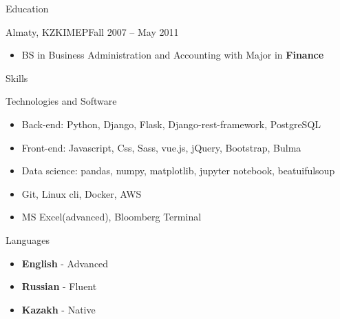 \documentclass[]{mcdowellcv}
\begin{document}
\pagebreak

\begin{cvsection}{Education}
  \begin{cvsubsection}{Almaty, KZ}{KIMEP}{Fall 2007 -- May 2011}
    \begin{itemize}
      \item BS in Business Administration and Accounting with Major in \textbf{Finance}
    \end{itemize}
  \end{cvsubsection}
\end{cvsection}

\begin{cvsection}{Skills}
  \begin{cvsubsection}{Technologies and Software}{}{}	
      \begin{itemize}
        \item Back-end: Python, Django, Flask, Django-rest-framework, PostgreSQL
        \item Front-end: Javascript, Css, Sass, vue.js, jQuery, Bootstrap, Bulma
        \item Data science: pandas, numpy, matplotlib, jupyter notebook, beatuifulsoup
        \item Git, Linux cli, Docker, AWS
        \item MS Excel(advanced), Bloomberg Terminal
      \end{itemize}
  \end{cvsubsection}
  \begin{cvsubsection}{Languages}{}{}	
    \begin{itemize}
      \item \textbf{English} - Advanced
      \item \textbf{Russian} - Fluent
      \item \textbf{Kazakh} - Native
    \end{itemize}
  \end{cvsubsection}
\end{cvsection}
\end{document}
